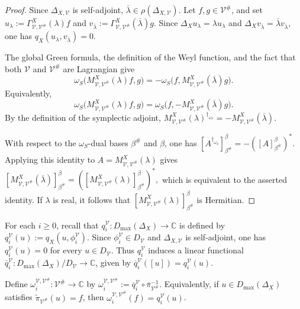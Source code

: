 \documentclass[12pt]{amsart}
\theoremstyle{plain}
\theoremstyle{definition}
\theoremstyle{remark}
\numberwithin{equation}{section} \numberwithin{figure}{section}
\renewcommand*{\to}{\rightarrow}
\newcommand{\mb}[1]{\mathbb{#1}} %
\begin{document}
\begin{proof}
Since \(\Delta_{X,\mathcal V}\) is self-adjoint,
\(\overline{\lambda}\in\rho(\Delta_{X,\mathcal V})\). Let
\(f,g\in\mathcal V^\#\), and set
\(u_\lambda:=
\Gamma_{\mathcal V,\mathcal V^\#}^{X}(\lambda)f\) and
\(v_{\overline{\lambda}}:=
\Gamma_{\mathcal V,\mathcal V^\#}^{X}
(\overline{\lambda})g\).
Since
\(\Delta_Xu_\lambda=\lambda u_\lambda\) and
\(\Delta_Xv_{\overline{\lambda}}
=\overline{\lambda}v_{\overline{\lambda}}\), one has
\(q_X(u_\lambda,v_{\overline{\lambda}})=0\).

The global Green formula, the definition of the Weyl function, and
the fact that both \(\mathcal V\) and \(\mathcal V^\#\) are
Lagrangian give
\[
\omega_S\bigl(
M_{\mathcal V,\mathcal V^\#}^{X}(\lambda)f,g
\bigr)
=
-\omega_S\bigl(
f,
M_{\mathcal V,\mathcal V^\#}^{X}(\overline{\lambda})g
\bigr).
\]
Equivalently,
\[
\omega_S\bigl(
M_{\mathcal V,\mathcal V^\#}^{X}(\lambda)f,g
\bigr)
=
\omega_S\bigl(
f,
-M_{\mathcal V,\mathcal V^\#}^{X}(\overline{\lambda})g
\bigr).
\]
By the definition of the symplectic adjoint,
\(
M_{\mathcal V,\mathcal V^\#}^{X}(\lambda)
^{\dagger_{\omega_S}}
=
-M_{\mathcal V,\mathcal V^\#}^{X}(\overline{\lambda}).
\)

With respect to the \(\omega_S\)-dual bases \(\beta^\#\) and
\(\beta\), one has
\(
[A^{\dagger_{\omega_S}}]_{\beta^\#}^{\beta}
=
-([A]_{\beta^\#}^{\beta})^*.
\)
Applying this identity to
\(A=M_{\mathcal V,\mathcal V^\#}^{X}(\lambda)\) gives
\(
[M_{\mathcal V,\mathcal V^\#}^{X}(\overline{\lambda})]
_{\beta^\#}^{\beta}
=
([M_{\mathcal V,\mathcal V^\#}^{X}(\lambda)]
_{\beta^\#}^{\beta})^*,
\)
which is equivalent to the asserted identity. If \(\lambda\) is
real, it follows that
\([M_{\mathcal V,\mathcal V^\#}^{X}(\lambda)]
_{\beta^\#}^{\beta}\) is Hermitian.
\end{proof}



For each \(i\geq0\), recall that
\(q_i^{\mathcal V}:D_{\max}(\Delta_X)\to\mb C\) is defined by
\(q_i^{\mathcal V}(u):=q_X(u,\phi_i^{\mathcal V})\).
Since \(\phi_i^{\mathcal V}\in D_{\mathcal V}\) and
\(\Delta_{X,\mathcal V}\) is self-adjoint, one has
\(q_i^{\mathcal V}(u)=0\) for every \(u\in D_{\mathcal V}\).
Thus \(q_i^{\mathcal V}\) induces a linear functional
\(\overline{q}_i^{\mathcal V}:
D_{\max}(\Delta_X)/D_{\mathcal V}\to\mb C\), given by
\(\overline{q}_i^{\mathcal V}([u])=q_i^{\mathcal V}(u)\).

Define
\(\omega_i^{\mathcal V,\mathcal V^\#}:
\mathcal V^\#\to\mb C\) by
\(\omega_i^{\mathcal V,\mathcal V^\#}
:=\overline{q}_i^{\mathcal V}
\circ\overline{\pi}_{\mathcal V^\#}^{-1}\).
Equivalently, if \(u\in D_{\max}(\Delta_X)\) satisfies
\(\widetilde{\pi}_{\mathcal V^\#}(u)=f\), then
\(\omega_i^{\mathcal V,\mathcal V^\#}(f)
=q_i^{\mathcal V}(u)\).
\end{document}
